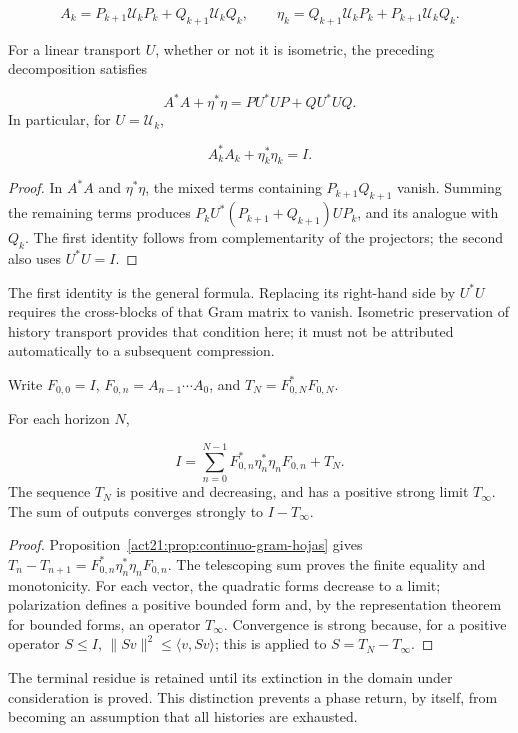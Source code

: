 \[
A_k=P_{k+1}\mathcal U_kP_k+Q_{k+1}\mathcal U_kQ_k,
\qquad
\eta_k=Q_{k+1}\mathcal U_kP_k+P_{k+1}\mathcal U_kQ_k.
\]
\begin{proposition}
\label{act21:prop:continuo-gram-hojas}
For a linear transport \(U\), whether or not it is isometric, the preceding decomposition satisfies

\[
A^*A+\eta^*\eta=PU^*UP+QU^*UQ.
\]
In particular, for \(U=\mathcal U_k\),

\[
A_k^*A_k+\eta_k^*\eta_k=I.
\]
\end{proposition}
\begin{proof}
In \(A^*A\) and \(\eta^*\eta\), the mixed terms containing \(P_{k+1}Q_{k+1}\) vanish. Summing the remaining terms produces \(P_kU^*(P_{k+1}+Q_{k+1})UP_k\), and its analogue with \(Q_k\). The first identity follows from complementarity of the projectors; the second also uses \(U^*U=I\).
\end{proof}

The first identity is the general formula. Replacing its right-hand side by \(U^*U\) requires the cross-blocks of that Gram matrix to vanish. Isometric preservation of history transport provides that condition here; it must not be attributed automatically to a subsequent compression.

Write \(F_{0,0}=I\), \(F_{0,n}=A_{n-1}\cdots A_0\), and \(T_N=F_{0,N}^*F_{0,N}\).

\begin{theorem}
\label{act21:thm:continuo-descomposicion-terminal}
For each horizon \(N\),

\[
I=\sum_{n=0}^{N-1}
F_{0,n}^*\eta_n^*\eta_nF_{0,n}+T_N.
\]
The sequence \(T_N\) is positive and decreasing, and has a positive strong limit \(T_\infty\). The sum of outputs converges strongly to \(I-T_\infty\).
\end{theorem}
\begin{proof}
Proposition~\ref{act21:prop:continuo-gram-hojas} gives \(T_n-T_{n+1}=F_{0,n}^*\eta_n^*\eta_nF_{0,n}\). The telescoping sum proves the finite equality and monotonicity. For each vector, the quadratic forms decrease to a limit; polarization defines a positive bounded form and, by the representation theorem for bounded forms, an operator \(T_\infty\). Convergence is strong because, for a positive operator \(S\leq I\), \(\|Sv\|^2\leq\langle v,Sv\rangle\); this is applied to \(S=T_N-T_\infty\).
\end{proof}

The terminal residue is retained until its extinction in the domain under consideration is proved. This distinction prevents a phase return, by itself, from becoming an assumption that all histories are exhausted.

